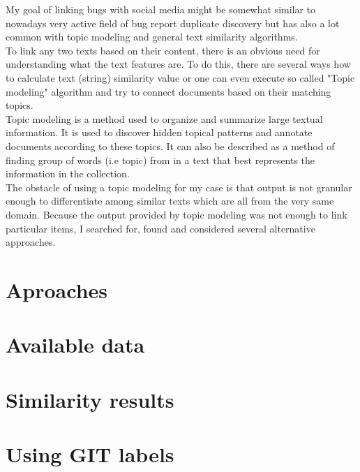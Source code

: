My goal of linking bugs with social media might be somewhat similar to nowadays very active field of bug report duplicate discovery but has also a lot common with topic modeling and general text similarity algorithms.\\
To link any two texts based on their content, there is an obvious need for understanding what the text features are. 
To do this, there are several ways how to calculate text (string) similarity value or one can even execute so called "Topic modeling" algorithm and try to connect documents based on their matching topics.\\
Topic modeling is a method used to organize and summarize large textual information. It is used to discover hidden topical patterns and annotate documents according to these topics. It can also be described as a method of finding group of words (i.e topic) from in a text that best represents the information in the collection.\\
The obstacle of using a topic modeling for my case is that output is not granular enough to differentiate among similar texts which are all from the very same domain. Because the output provided by topic modeling was not enough to link particular items, I searched for, found and considered several alternative approaches.

\section{Aproaches}
\label{sec:pairingApproaches}


\section{Available data}


\section{Similarity results}


\section{Using GIT labels}

